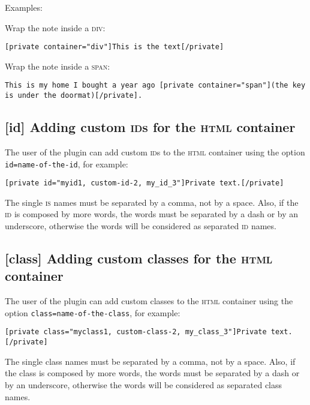 \documentclass[a4paper,10pt]{article}
\begin{document}
Examples:

Wrap the note inside a \textsc{div}:

\begin{lstlisting}
[private container="div"]This is the text[/private]
\end{lstlisting}

Wrap the note inside a \textsc{span}:

\begin{lstlisting}
This is my home I bought a year ago [private container="span"](the key is under the doormat)[/private].
\end{lstlisting}


\subsection{[id] Adding custom \textsc{id}s for the \textsc{html} container}

The user of the plugin can add custom \textsc{id}s to the \textsc{html} container using the option \verb+id=name-of-the-id+, for example:

\begin{lstlisting}
[private id="myid1, custom-id-2, my_id_3"]Private text.[/private]
\end{lstlisting}

The single \textsc{is} names must be separated by a comma, not by a space. Also, if the \textsc{id} is composed by more words, the words must be separated by a dash or by an underscore, otherwise the words will be considered as separated \textsc{id} names.

\subsection{[class] Adding custom classes for the \textsc{html} container}

The user of the plugin can add custom classes to the \textsc{html} container using the option \verb+class=name-of-the-class+, for example:

\begin{lstlisting}
[private class="myclass1, custom-class-2, my_class_3"]Private text.[/private]
\end{lstlisting}

The single class names must be separated by a comma, not by a space. Also, if the class is composed by more words, the words must be separated by a dash or by an underscore, otherwise the words will be considered as separated class names.
\end{document}
